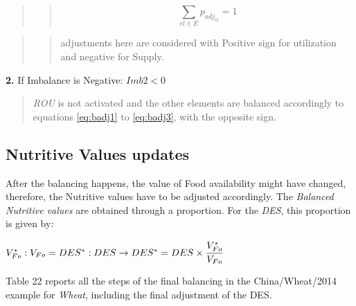 \documentclass[]{article}
\begin{document}
\begin{quote}
\begin{quote}
\begin{equation}
\label{eq:badj3}
\sum \limits_{el \in E} p_{adj_{el}} = 1
\end{equation}
\end{quote}
\end{quote}

\begin{quote}
\begin{quote}
adjustments here are considered with Positive sign for utilization and
negative for Supply.
\end{quote}
\end{quote}

\textbf{2.} If Imbalance is Negative: \(Imb2 < 0\)

\begin{quote}
\emph{ROU} is not activated and the other elements are balanced
accordingly to equations \ref{eq:badj1} to \ref{eq:badj3}, with the
opposite sign.
\end{quote}

\subsection*{Nutritive Values updates}\label{nutritive-values-updates}

After the balancing happens, the value of Food availability might have
changed, therefore, the Nutritive values have to be adjusted
accordingly. The \emph{Balanced Nutritive values} are obtained through a
proportion. For the \emph{DES}, this proportion is given by:

\(V^*_{Fo} : V_{Fo} = DES^* : DES \rightarrow DES^* = DES \times \cfrac{V^*_{Fo}}{V_{Fo}}\)

Table 22 reports all the steps of the final balancing in the
China/Wheat/2014 example for \emph{Wheat}, including the final
adjustment of the DES.
\end{document}
